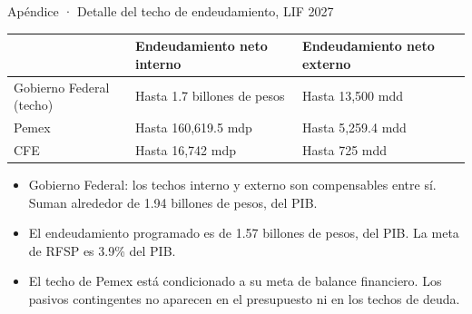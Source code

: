 \begin{frame}{Apéndice · Detalle del techo de endeudamiento, LIF 2027}
  \vspace{0.4em}
  {\small
  \begin{tabularx}{\textwidth}{@{}>{\raggedright\arraybackslash}p{3.1cm}>{\raggedright\arraybackslash}X>{\raggedright\arraybackslash}X@{}}
    \toprule
    & \textbf{Endeudamiento neto interno} & \textbf{Endeudamiento neto externo}\\
    \midrule
    Gobierno Federal (techo) & Hasta 1.7 billones de pesos & Hasta 13,500 mdd\\\addlinespace
    Pemex & Hasta 160,619.5 mdp & Hasta 5,259.4 mdd\\\addlinespace
    CFE & Hasta 16,742 mdp & Hasta 725 mdd\\
    \bottomrule
  \end{tabularx}}
  \vspace{0.7em}
  \begin{itemize}\setlength{\itemsep}{0.3em}\small
    \item Gobierno Federal: los techos interno y externo son compensables entre sí. Suman alrededor de 1.94 billones de pesos,  del PIB.
    \item El endeudamiento programado es de 1.57 billones de pesos,  del PIB. La meta de RFSP es 3.9\% del PIB.
    \item El techo de Pemex está condicionado a su meta de balance financiero. Los pasivos contingentes no aparecen en el presupuesto ni en los techos de deuda.
  \end{itemize}
\end{frame}
